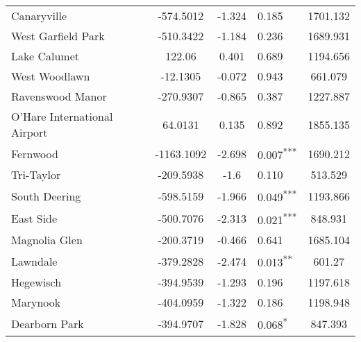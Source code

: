 \documentclass[12pt]{report}
\begin{document}
\begin{longtable}{l S[table-format=6.4] S[table-format=3.4] l S[table-format=4.4]}
	Canaryville                  & -574.5012            & -1.324           & 0.185                      & 1701.132                          \\
	West Garfield Park           & -510.3422            & -1.184           & 0.236                      & 1689.931                          \\
	Lake Calumet                 & 122.06               & 0.401            & 0.689                      & 1194.656                          \\
	West Woodlawn                & -12.1305             & -0.072           & 0.943                      & 661.079                           \\
	Ravenswood Manor             & -270.9307            & -0.865           & 0.387                      & 1227.887                          \\
	O'Hare International Airport & 64.0131              & 0.135            & 0.892                      & 1855.135                          \\
	Fernwood                     & -1163.1092           & -2.698           & 0.007\textsuperscript{***} & 1690.212                          \\
	Tri-Taylor                   & -209.5938            & -1.6             & 0.110                      & 513.529                           \\
	South Deering                & -598.5159            & -1.966           & 0.049\textsuperscript{***} & 1193.866                          \\
	East Side                    & -500.7076            & -2.313           & 0.021\textsuperscript{***} & 848.931                           \\
	Magnolia Glen                & -200.3719            & -0.466           & 0.641                      & 1685.104                          \\
	Lawndale                     & -379.2828            & -2.474           & 0.013\textsuperscript{**}  & 601.27                            \\
	Hegewisch                    & -394.9539            & -1.293           & 0.196                      & 1197.618                          \\
	Marynook                     & -404.0959            & -1.322           & 0.186                      & 1198.948                          \\
	Dearborn Park                & -394.9707            & -1.828           & 0.068\textsuperscript{*}   & 847.393                           \\

\end{longtable}
\end{document}
